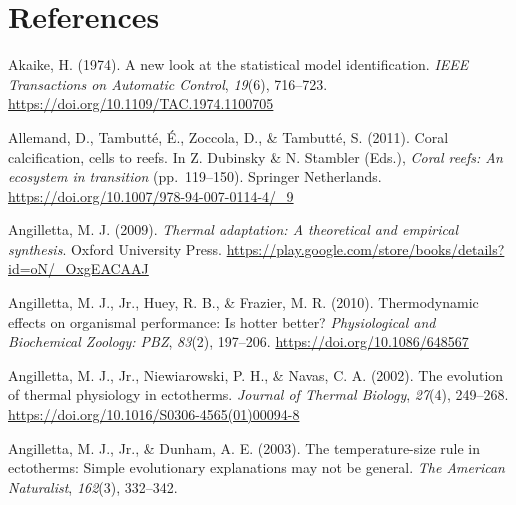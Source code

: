 \documentclass{CSUNthesis}
\begin{document}
\chapter*{References}\label{references}


\noindent

\setlength{\parindent}{-0.20in}
\setlength{\leftskip}{0.20in}
\setlength{\parskip}{4pt}

\begingroup
\small

Akaike, H. (1974). A new look at the statistical model identification. \textit{IEEE Transactions on Automatic Control}, \textit{19}(6), 716--723. \url{https://doi.org/10.1109/TAC.1974.1100705}

\vspace{0.1em}

Allemand, D., Tambutté, É., Zoccola, D., \& Tambutté, S. (2011). Coral calcification, cells to reefs. In Z. Dubinsky \& N. Stambler (Eds.), \textit{Coral reefs: An ecosystem in transition} (pp.~119--150). Springer Netherlands. \url{https://doi.org/10.1007/978-94-007-0114-4/_9}

\vspace{0.1em}

Angilletta, M. J. (2009). \textit{Thermal adaptation: A theoretical and empirical synthesis}. Oxford University Press. \url{https://play.google.com/store/books/details?id=oN/_OxgEACAAJ}

\vspace{0.1em}

Angilletta, M. J., Jr., Huey, R. B., \& Frazier, M. R. (2010). Thermodynamic effects on organismal performance: Is hotter better? \textit{Physiological and Biochemical Zoology: PBZ}, \textit{83}(2), 197--206. \url{https://doi.org/10.1086/648567}

\vspace{0.1em}

Angilletta, M. J., Jr., Niewiarowski, P. H., \& Navas, C. A. (2002). The evolution of thermal physiology in ectotherms. \textit{Journal of Thermal Biology}, \textit{27}(4), 249--268. \url{https://doi.org/10.1016/S0306-4565(01)00094-8}

\vspace{0.1em}

Angilletta, M. J., Jr., \& Dunham, A. E. (2003). The temperature-size rule in ectotherms: Simple evolutionary explanations may not be general. \textit{The American Naturalist}, \textit{162}(3), 332--342.
\end{document}
